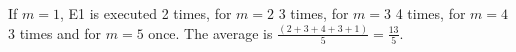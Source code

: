 If $m = 1$, E1 is executed 2 times, for $m = 2$ 3 times, for $m = 3$ 4 times, for $m = 4$ 3 times and for $m = 5$ once.
The average is $\frac{(2 + 3 + 4 + 3 + 1)}{5} = \frac{13}{5}$.
